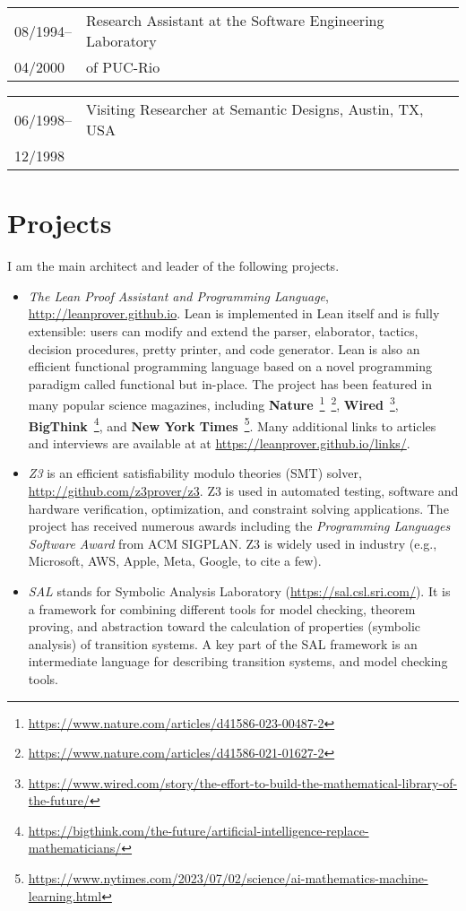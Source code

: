 \documentclass{article}
\newcommand{\job}[4]{\begin{flushleft}
                                        \begin{tabular}{ll}
                                         #1-- & #3 \\
                     #2 & #4 \\
                    \end{tabular}
                                        \end{flushleft}
                    }
\begin{document}
\job{08/1994}{04/2000}{Research Assistant at the Software Engineering Laboratory}{of PUC-Rio}

\job{06/1998}{12/1998}{Visiting Researcher at Semantic Designs, Austin, TX, USA}{}

\section*{Projects}

I am the main architect and leader of the following projects.

\begin{itemize}
\item {\em The Lean Proof Assistant and Programming Language}, \url{http://leanprover.github.io}.
Lean is implemented in Lean itself and is fully extensible: users can modify and extend the parser, elaborator,
tactics, decision procedures, pretty printer, and code generator.
Lean is also an efficient functional programming language based on a novel programming paradigm called functional but in-place.
The project has been featured in many popular science magazines, including
{\bf Nature}~\footnote{\url{https://www.nature.com/articles/d41586-023-00487-2}}~\footnote{\url{https://www.nature.com/articles/d41586-021-01627-2}},
  {\bf Wired}~\footnote{\url{https://www.wired.com/story/the-effort-to-build-the-mathematical-library-of-the-future/}},
  {\bf BigThink}~\footnote{\url{https://bigthink.com/the-future/artificial-intelligence-replace-mathematicians/}},
  and {\bf New York Times}~\footnote{\url{https://www.nytimes.com/2023/07/02/science/ai-mathematics-machine-learning.html}}.
  Many additional links to articles and interviews are available at at \url{https://leanprover.github.io/links/}.

\item {\em Z3} is an efficient satisfiability modulo theories (SMT) solver, \url{http://github.com/z3prover/z3}.
  Z3 is used in automated testing, software and hardware verification, optimization, and constraint solving applications.
  The project has received numerous awards including the {\em Programming Languages Software Award} from ACM SIGPLAN.
  Z3 is widely used in industry (e.g., Microsoft, AWS, Apple, Meta, Google, to cite a few).

\item {\em SAL} stands for Symbolic Analysis Laboratory (\url{https://sal.csl.sri.com/}). It is a framework for combining different tools for
 model checking, theorem proving, and abstraction toward the calculation of properties (symbolic analysis) of transition systems. A
 key part of the SAL framework is an intermediate language for describing transition systems, and model checking tools.

\end{itemize}
\end{document}
